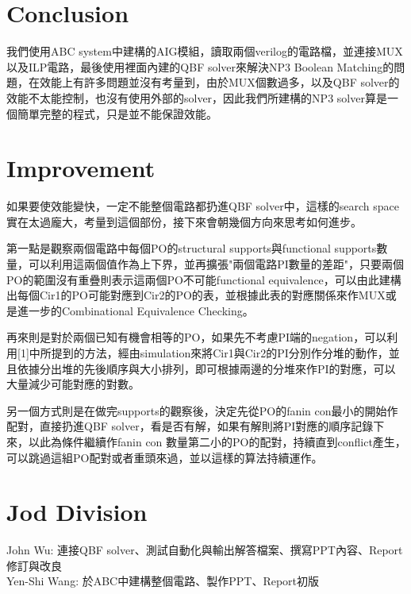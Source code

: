\section{Conclusion}
我們使用ABC system中建構的AIG模組，讀取兩個verilog的電路檔，並連接MUX以及ILP電路，最後使用裡面內建的QBF solver來解決NP3 Boolean Matching的問題，在效能上有許多問題並沒有考量到，由於MUX個數過多，以及QBF solver的效能不太能控制，也沒有使用外部的solver，因此我們所建構的NP3 solver算是一個簡單完整的程式，只是並不能保證效能。

\section{Improvement}
如果要使效能變快，一定不能整個電路都扔進QBF solver中，這樣的search space實在太過龐大，考量到這個部份，接下來會朝幾個方向來思考如何進步。

第一點是觀察兩個電路中每個PO的structural supports與functional supports數量，可以利用這兩個值作為上下界，並再擴張"兩個電路PI數量的差距"，只要兩個PO的範圍沒有重疊則表示這兩個PO不可能functional equivalence，可以由此建構出每個Cir1的PO可能對應到Cir2的PO的表，並根據此表的對應關係來作MUX或是進一步的Combinational Equivalence Checking。

再來則是對於兩個已知有機會相等的PO，如果先不考慮PI端的negation，可以利用[1]中所提到的方法，經由simulation來將Cir1與Cir2的PI分別作分堆的動作，並且依據分出堆的先後順序與大小排列，即可根據兩邊的分堆來作PI的對應，可以大量減少可能對應的對數。

另一個方式則是在做完supports的觀察後，決定先從PO的fanin con最小的開始作配對，直接扔進QBF solver，看是否有解，如果有解則將PI對應的順序記錄下來，以此為條件繼續作fanin con 數量第二小的PO的配對，持續直到conflict產生，可以跳過這組PO配對或者重頭來過，並以這樣的算法持續運作。

\section{Jod Division}
John Wu: 連接QBF solver、測試自動化與輸出解答檔案、撰寫PPT內容、Report修訂與改良\\

Yen-Shi Wang: 於ABC中建構整個電路、製作PPT、Report初版\\

